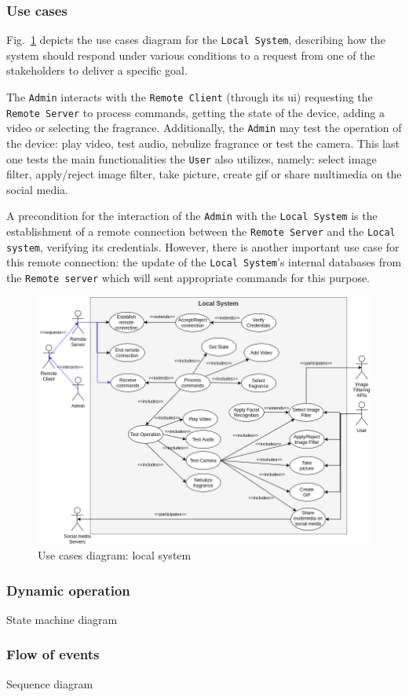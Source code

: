 \subsubsection{Use cases}
\label{sec:use-cases}
Fig.~\ref{fig:use-cases-local} depicts the use cases diagram for the
\texttt{Local System}, describing how the system should respond under various
conditions to a request from one of the stakeholders to deliver a specific
goal.

The \texttt{Admin} interacts with the \texttt{Remote Client} (through its
\gls{ui}) requesting the \texttt{Remote Server} to process commands, getting the
state of the device, adding a video or selecting the fragrance. Additionally,
the \texttt{Admin} may test the operation of the device: play video, test audio,
nebulize fragrance or test the camera. This last one tests the main
functionalities the \texttt{User} also utilizes, namely: select image filter,
apply/reject image filter, take picture, create \gls{gif} or share multimedia on
the social media.

A precondition for the interaction of the \texttt{Admin} with the \texttt{Local System} is the establishment of a remote
connection between the \texttt{Remote Server} and the \texttt{Local system},
verifying its credentials. However, there is another important use case for this
remote connection: the update of the \texttt{Local System}'s internal databases
from the \texttt{Remote server} which will sent appropriate commands for this purpose.
%
\begin{figure}[htb!]
\centering
    \includegraphics[width=0.85\columnwidth]{./img/use-cases-local.png}
  \caption{Use cases diagram: local system}%
\label{fig:use-cases-local}
\end{figure}
%
\subsubsection{Dynamic operation}
\label{sec:dyn-oper}
State machine diagram

\subsubsection{Flow of events}
\label{sec:flow-events}
Sequence diagram

